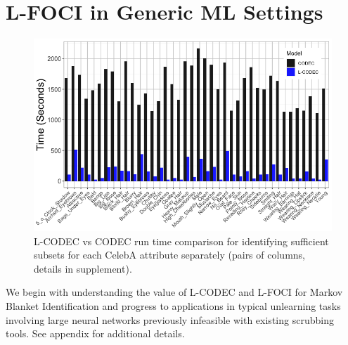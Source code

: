 \section{L-FOCI in Generic ML Settings}
\begin{figure}
    \centering
    \includegraphics[width=0.98\columnwidth,trim={0, 0, 0, 0},clip]{5_unlearn/figs/Speed_Hist.png}
    \caption{\label{fig:speed_hist} L-CODEC vs CODEC run time comparison for identifying sufficient subsets for each CelebA attribute separately (pairs of columns, details in supplement).}
\end{figure}
We begin with understanding the value of L-CODEC and L-FOCI for Markov Blanket Identification and progress to applications
in typical unlearning tasks involving large neural networks previously infeasible with existing scrubbing tools.
See appendix for additional details. 


